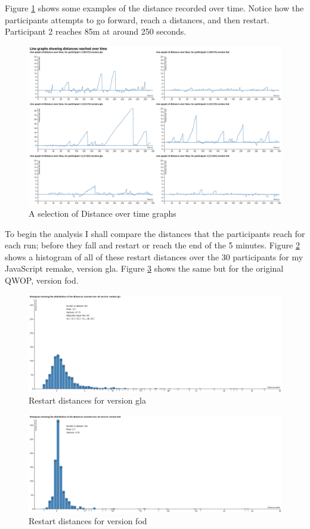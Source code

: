 \documentclass[12pt,a4paper,twoside,openright]{report}
\begin{document}
Figure \ref{assorted} shows some examples of the distance recorded over time. Notice how the participants attempts to go forward, reach a distances, and then restart. Participant 2 reaches 85m at around 250 seconds.
\begin{figure}[tbh]
\centerline{\includegraphics[scale=0.39]{assortedLineGraphs.PNG}}
\caption{A selection of Distance over time graphs}
\label{assorted}
\end{figure}

To begin the analysis I shall compare the distances that the participants reach for each run; before they fall and restart or reach the end of the 5 minutes. Figure \ref{glaRestarts} shows a histogram of all of these restart distances over the 30 participants for my JavaScript remake, version gla. Figure \ref{fodRestarts} shows the same but for the original QWOP, version fod.

\begin{figure}[tbh]
\centerline{\includegraphics[scale=0.39]{glaRestarts.PNG}}
\caption{Restart distances for version gla}
\label{glaRestarts}
\end{figure}
\begin{figure}[tbh]
\centerline{\includegraphics[scale=0.39]{fodRestarts.PNG}}
\caption{Restart distances for version fod}
\label{fodRestarts}
\end{figure}
\end{document}
